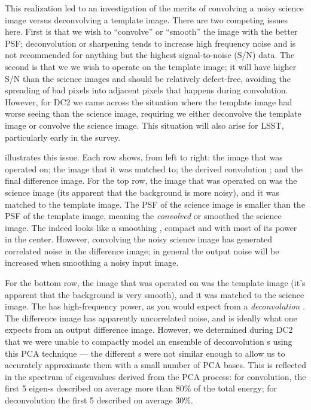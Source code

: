 This realization led to an investigation of the merits of convolving a
noisy science image versus deconvolving a template image.  There are
two competing issues here.  First is that we wish to ``convolve'' or
``smooth'' the image with the better PSF; deconvolution or sharpening
tends to increase high frequency noise and is not recommended for
anything but the highest signal-to-noise (S/N) data.  The second is
that we we wish to operate on the template image; it will have higher
S/N than the science images and should be relatively defect-free,
avoiding the spreading of bad pixels into adjacent pixels that happens
during convolution.  However, for DC2 we came across the situation
where the template image had worse seeing than the science image,
requiring we either deconvolve the template image or convolve the
science image.   This situation will also arise for LSST, particularly
early in the survey.

 illustrates this issue.  Each row shows, from
left to right: the image that was operated on; the image that it was
matched to; the derived convolution ; and the final
difference image.  For the top row, the image that was operated on was
the science image (its apparent that the background is more noisy),
and it was matched to the template image.  The PSF of the science
image is smaller than the PSF of the template image, meaning the
 \textit{convolved} or smoothed the science image.  The
 indeed looks like a smoothing , compact and 
with most of its power in the center.  However, convolving the noisy
science image has generated correlated noise in the difference image;
 in general the
output noise will be increased when smoothing a noisy input
image.

For the bottom row, the image that was operated on was the template
image (it's apparent that the background is very smooth), and it was
matched to the science image.  The  has high-frequency
power, as you would expect from a \textit{deconvolution}
.  The difference image has apparently uncorrelated 
noise, and is ideally what one expects from an output difference
image.  However, we determined during DC2 that we were unable to
compactly model an ensemble of deconvolution s using this
PCA technique --- the different s were not similar
enough to allow us to accurately approximate them with a small number
of PCA bases.  This is reflected in the spectrum of eigenvalues
derived from the PCA process: for convolution, the first 5
eigen-s described on average more than 80\% of the total
energy; for deconvolution the first 5 described on average 30\%.

